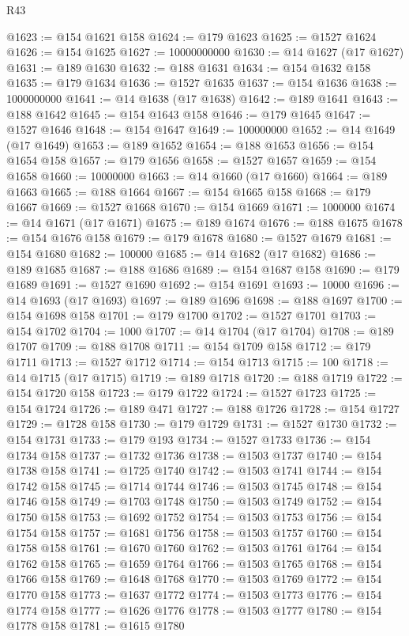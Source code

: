 \begin{lexlean}{R43}
\begin{coremodule}
@1623 := @154 @1621 @158
@1624 := @179 @1623
@1625 := @1527 @1624
@1626 := @154 @1625
@1627 := 10000000000
@1630 := @14 @1627 (@17 @1627)
@1631 := @189 @1630
@1632 := @188 @1631
@1634 := @154 @1632 @158
@1635 := @179 @1634
@1636 := @1527 @1635
@1637 := @154 @1636
@1638 := 1000000000
@1641 := @14 @1638 (@17 @1638)
@1642 := @189 @1641
@1643 := @188 @1642
@1645 := @154 @1643 @158
@1646 := @179 @1645
@1647 := @1527 @1646
@1648 := @154 @1647
@1649 := 100000000
@1652 := @14 @1649 (@17 @1649)
@1653 := @189 @1652
@1654 := @188 @1653
@1656 := @154 @1654 @158
@1657 := @179 @1656
@1658 := @1527 @1657
@1659 := @154 @1658
@1660 := 10000000
@1663 := @14 @1660 (@17 @1660)
@1664 := @189 @1663
@1665 := @188 @1664
@1667 := @154 @1665 @158
@1668 := @179 @1667
@1669 := @1527 @1668
@1670 := @154 @1669
@1671 := 1000000
@1674 := @14 @1671 (@17 @1671)
@1675 := @189 @1674
@1676 := @188 @1675
@1678 := @154 @1676 @158
@1679 := @179 @1678
@1680 := @1527 @1679
@1681 := @154 @1680
@1682 := 100000
@1685 := @14 @1682 (@17 @1682)
@1686 := @189 @1685
@1687 := @188 @1686
@1689 := @154 @1687 @158
@1690 := @179 @1689
@1691 := @1527 @1690
@1692 := @154 @1691
@1693 := 10000
@1696 := @14 @1693 (@17 @1693)
@1697 := @189 @1696
@1698 := @188 @1697
@1700 := @154 @1698 @158
@1701 := @179 @1700
@1702 := @1527 @1701
@1703 := @154 @1702
@1704 := 1000
@1707 := @14 @1704 (@17 @1704)
@1708 := @189 @1707
@1709 := @188 @1708
@1711 := @154 @1709 @158
@1712 := @179 @1711
@1713 := @1527 @1712
@1714 := @154 @1713
@1715 := 100
@1718 := @14 @1715 (@17 @1715)
@1719 := @189 @1718
@1720 := @188 @1719
@1722 := @154 @1720 @158
@1723 := @179 @1722
@1724 := @1527 @1723
@1725 := @154 @1724
@1726 := @189 @471
@1727 := @188 @1726
@1728 := @154 @1727
@1729 := @1728 @158
@1730 := @179 @1729
@1731 := @1527 @1730
@1732 := @154 @1731
@1733 := @179 @193
@1734 := @1527 @1733
@1736 := @154 @1734 @158
@1737 := @1732 @1736
@1738 := @1503 @1737
@1740 := @154 @1738 @158
@1741 := @1725 @1740
@1742 := @1503 @1741
@1744 := @154 @1742 @158
@1745 := @1714 @1744
@1746 := @1503 @1745
@1748 := @154 @1746 @158
@1749 := @1703 @1748
@1750 := @1503 @1749
@1752 := @154 @1750 @158
@1753 := @1692 @1752
@1754 := @1503 @1753
@1756 := @154 @1754 @158
@1757 := @1681 @1756
@1758 := @1503 @1757
@1760 := @154 @1758 @158
@1761 := @1670 @1760
@1762 := @1503 @1761
@1764 := @154 @1762 @158
@1765 := @1659 @1764
@1766 := @1503 @1765
@1768 := @154 @1766 @158
@1769 := @1648 @1768
@1770 := @1503 @1769
@1772 := @154 @1770 @158
@1773 := @1637 @1772
@1774 := @1503 @1773
@1776 := @154 @1774 @158
@1777 := @1626 @1776
@1778 := @1503 @1777
@1780 := @154 @1778 @158
@1781 := @1615 @1780

\end{coremodule}
\end{lexlean}
